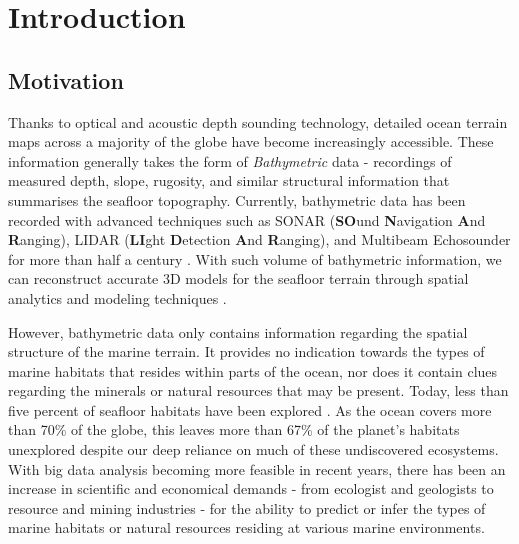 \chapter{Introduction}
\label{Introduction}

	\section{Motivation}
	
		Thanks to optical and acoustic depth sounding technology, detailed ocean terrain maps across a majority of the globe have become increasingly accessible. These information generally takes the form of \textit{Bathymetric} data - recordings of measured depth, slope, rugosity, and similar structural information that summarises the seafloor topography. Currently, bathymetric data has been recorded with advanced techniques such as SONAR (\textbf{SO}und \textbf{N}avigation \textbf{A}nd \textbf{R}anging), LIDAR (\textbf{LI}ght \textbf{D}etection \textbf{A}nd \textbf{R}anging), and Multibeam Echosounder for more than half a century \citep{Niedzielski2013231, Colbo201441}. With such volume of bathymetric information, we can reconstruct accurate 3D models for the seafloor terrain through spatial analytics and modeling techniques \citep{Niedzielski2013231}.
		
		However, bathymetric data only contains information regarding the spatial structure of the marine terrain. It provides no indication towards the types of marine habitats that resides within parts of the ocean, nor does it contain clues regarding the minerals or natural resources that may be present. Today, less than five percent of seafloor habitats have been explored \citep{NOAA}. As the ocean covers more than 70\% of the globe, this leaves more than 67\% of the planet's habitats unexplored despite our deep reliance on much of these undiscovered ecosystems. With big data analysis becoming more feasible in recent years, there has been an increase in scientific and economical demands - from ecologist and geologists to resource and mining industries - for the ability to predict or infer the types of marine habitats or natural resources residing at various marine environments.
		
